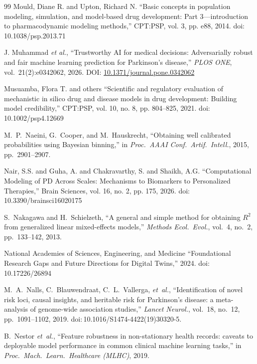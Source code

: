 \begin{thebibliography}{99}
 Mould, Diane R. and Upton, Richard N. ``Basic concepts in population modeling, simulation, and model-based drug development: Part 3---introduction to pharmacodynamic modeling methods,'' CPT:PSP, vol. 3, pp. e88, 2014. doi: 10.1038/psp.2013.71

J. Muhammad \textit{et al.},
``Trustworthy AI for medical decisions: Adversarially robust and fair machine learning prediction for Parkinson's disease,''
\textit{PLOS ONE}, vol.~21(2):e0342062, 2026. DOI: \href{https://doi.org/10.1371/journal.pone.0342062}{10.1371/journal.pone.0342062}

 Musuamba, Flora T. and others ``Scientific and regulatory evaluation of mechanistic in silico drug and disease models in drug development: Building model credibility,'' CPT:PSP, vol. 10, no. 8, pp. 804--825, 2021. doi: 10.1002/psp4.12669

M.~P.~Naeini, G.~Cooper, and M.~Hauskrecht, ``Obtaining well calibrated probabilities using Bayesian binning,'' in \textit{Proc.\ AAAI Conf.\ Artif.\ Intell.}, 2015, pp.~2901--2907.

 Nair, S.S. and Guha, A. and Chakravarthy, S. and Shaikh, A.G. ``Computational Modeling of PD Across Scales: Mechanisms to Biomarkers to Personalized Therapies,'' Brain Sciences, vol. 16, no. 2, pp. 175, 2026. doi: 10.3390/brainsci16020175

S.~Nakagawa and H.~Schielzeth, ``A general and simple method for
obtaining $R^2$ from generalized linear mixed-effects models,''
\textit{Methods Ecol.\ Evol.}, vol.~4, no.~2, pp.~133--142, 2013.

 National Academies of Sciences, Engineering, and Medicine ``Foundational Research Gaps and Future Directions for Digital Twins,'' 2024. doi: 10.17226/26894

M.~A.~Nalls, C.~Blauwendraat, C.~L.~Vallerga, \textit{et~al.}, ``Identification of novel risk loci, causal insights, and heritable risk for Parkinson's disease: a meta-analysis of genome-wide association studies,'' \textit{Lancet Neurol.}, vol.~18, no.~12, pp.~1091--1102, 2019. doi:\,10.1016/S1474-4422(19)30320-5.

B.~Nestor \textit{et~al.}, ``Feature robustness in non-stationary health records: caveats to deployable model performance in common clinical machine learning tasks,'' in \textit{Proc.\ Mach.\ Learn.\ Healthcare (MLHC)}, 2019.


\end{thebibliography}
